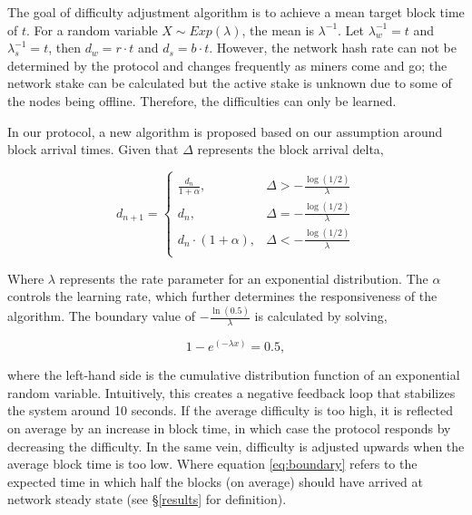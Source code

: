 The goal of difficulty adjustment algorithm is to achieve a mean target block time of $t$. For a random variable $X \sim Exp(\lambda)$, the mean is $\lambda^{-1}$. Let $\lambda_w^{-1} = t$ and $\lambda_s^{-1} = t$, then $d_w = r \cdot t$ and $d_s = b \cdot t$. However, the network hash rate can not be determined by the protocol and changes frequently as miners come and go; the network stake can be calculated but the active stake is unknown due to some of the nodes being offline. Therefore, the difficulties can only be learned.

In our protocol, a new algorithm is proposed based on our assumption around block arrival times. Given that $\Delta$ represents the block arrival delta,

\begin{equation}
    d_{n+1} = \begin{cases}
        \frac{d_n}{1+\alpha}, & \Delta > -\frac{\log(1/2)}{\lambda} \\
        d_n, & \Delta = -\frac{\log(1/2)}{\lambda} \\
        d_{n} \cdot (1 + \alpha), & \Delta < -\frac{\log(1/2)}{\lambda} \\
    \end{cases}
\end{equation}

Where $\lambda$ represents the rate parameter for an exponential distribution. The $\alpha$ controls the learning rate, which further determines the responsiveness of the algorithm. The boundary value of $-\frac{\ln (0.5)}{\lambda}$ is calculated by solving,

\begin{equation}
    \label{eq:boundary}
    1-e^{(-\lambda x)}=0.5,
\end{equation}

where the left-hand side is the cumulative distribution function of an exponential random variable. Intuitively, this creates a negative feedback loop that stabilizes the system around 10 seconds. If the average difficulty is too high, it is reflected on average by an increase in block time, in which case the protocol responds by decreasing the difficulty. In the same vein, difficulty is adjusted upwards when the average block time is too low. Where equation \ref{eq:boundary} refers to the expected time in which half the blocks (on average) should have arrived at network steady state (see \S\ref{results} for definition).

